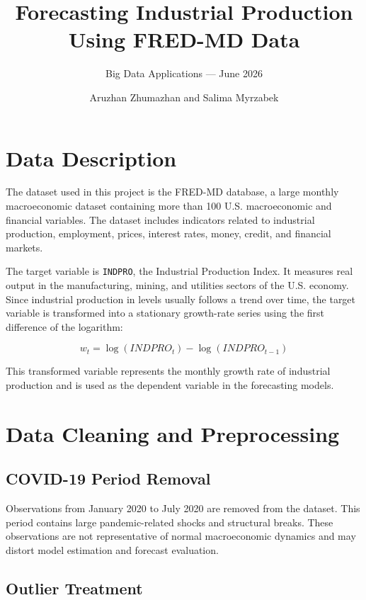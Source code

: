 \documentclass[
  letterpaper,
  DIV=11,
  numbers=noendperiod]{scrartcl}
\title{Forecasting Industrial Production Using FRED-MD Data}
\subtitle{Big Data Applications --- June 2026}
\author{Aruzhan Zhumazhan and Salima Myrzabek}
\date{}
\begin{document}
\maketitle


\section{Data Description}\label{data-description}

The dataset used in this project is the FRED-MD database, a large
monthly macroeconomic dataset containing more than 100 U.S.
macroeconomic and financial variables. The dataset includes indicators
related to industrial production, employment, prices, interest rates,
money, credit, and financial markets.

The target variable is \texttt{INDPRO}, the Industrial Production Index.
It measures real output in the manufacturing, mining, and utilities
sectors of the U.S. economy. Since industrial production in levels
usually follows a trend over time, the target variable is transformed
into a stationary growth-rate series using the first difference of the
logarithm:

\[
w_t = \log(INDPRO_t) - \log(INDPRO_{t-1})
\]

This transformed variable represents the monthly growth rate of
industrial production and is used as the dependent variable in the
forecasting models.

\section{Data Cleaning and
Preprocessing}\label{data-cleaning-and-preprocessing}

\subsection{COVID-19 Period Removal}\label{covid-19-period-removal}

Observations from January 2020 to July 2020 are removed from the
dataset. This period contains large pandemic-related shocks and
structural breaks. These observations are not representative of normal
macroeconomic dynamics and may distort model estimation and forecast
evaluation.

\subsection{Outlier Treatment}\label{outlier-treatment}
\end{document}

